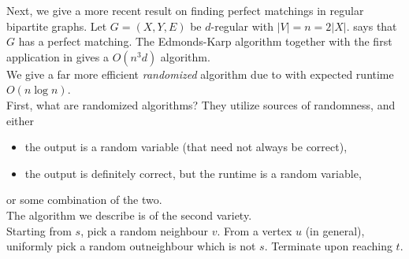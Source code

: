 			Next, we give a more recent result on finding perfect matchings in regular bipartite graphs. Let $G = (X,Y,E)$ be $d$-regular with $|V| = n = 2|X|$.  says that $G$ has a perfect matching. The Edmonds-Karp algorithm together with the first application in  gives a $O(n^3 d)$ algorithm.\\
			We give a far more efficient \emph{randomized} algorithm due to \cite{Goel11perfectmatchings} with expected runtime $O(n\log n)$.\\
			First, what are randomized algorithms? They utilize sources of randomness, and either
			\begin{itemize}
				\item the output is a random variable (that need not always be correct),
				\item the output is definitely correct, but the runtime is a random variable,
			\end{itemize}
			or some combination of the two.\\
			The algorithm we describe is of the second variety.\\
			Starting from $s$, pick a random neighbour $v$. From a vertex $u$ (in general), uniformly pick a random outneighbour which is not $s$. Terminate upon reaching $t$.